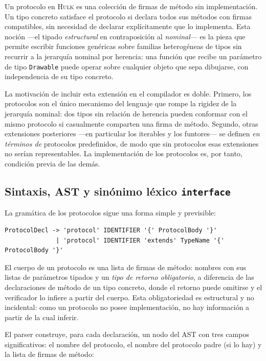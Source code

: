 \documentclass[11pt,a4paper,oneside,openany]{report}
\newcommand{\hulk}{\textsc{Hulk}}
\newcommand{\code}[1]{\texttt{#1}}
\begin{document}
Un protocolo en \hulk{} es una colección de firmas de método sin
implementación. Un tipo concreto satisface el protocolo si declara todos sus
métodos con firmas compatibles, sin necesidad de declarar explícitamente que
lo implementa. Esta noción ---el tipado \emph{estructural} en contraposición
al \emph{nominal}--- es la pieza que permite escribir funciones genéricas
sobre familias heterogéneas de tipos sin recurrir a la jerarquía nominal por
herencia: una función que recibe un parámetro de tipo \code{Drawable} puede
operar sobre cualquier objeto que sepa dibujarse, con independencia de su
tipo concreto.

La motivación de incluir esta extensión en el compilador es doble. Primero,
los protocolos son el único mecanismo del lenguaje que rompe la rigidez de
la jerarquía nominal: dos tipos sin relación de herencia pueden conformar
con el mismo protocolo si casualmente comparten una firma de método.
Segundo, otras extensiones posteriores ---en particular los iterables y los
funtores--- se definen \emph{en términos de} protocolos predefinidos, de
modo que sin protocolos esas extensiones no serían representables. La
implementación de los protocolos es, por tanto, condición previa de las
demás.

\subsection{Sintaxis, AST y sinónimo léxico \code{interface}}

La gramática de los protocolos sigue una forma simple y previsible:

\begin{lstlisting}[style=bnf, caption={Producciones gramaticales para la declaración de protocolos.}, label={lst:gram-protocol}]
ProtocolDecl -> 'protocol' IDENTIFIER '{' ProtocolBody '}'
              | 'protocol' IDENTIFIER 'extends' TypeName '{' ProtocolBody '}'
\end{lstlisting}

El cuerpo de un protocolo es una lista de firmas de método: nombres con sus
listas de parámetros tipados y un \emph{tipo de retorno obligatorio}, a
diferencia de las declaraciones de método de un tipo concreto, donde el
retorno puede omitirse y el verificador lo infiere a partir del cuerpo.
Esta obligatoriedad es estructural y no incidental: como un protocolo no
posee implementación, no hay información a partir de la cual inferir.

El parser construye, para cada declaración, un nodo del AST con tres campos
significativos: el nombre del protocolo, el nombre del protocolo padre (si
lo hay) y la lista de firmas de método:
\end{document}
